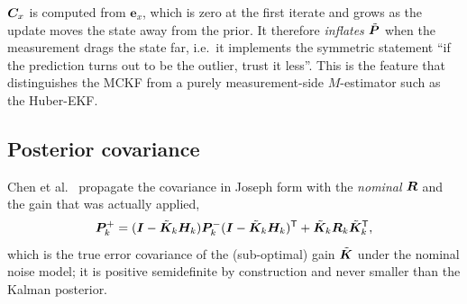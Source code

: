 \begin{remark}\label{rem:mc-Cx}
$\bm{C}_x$ is computed from $\bm{e}_x$, which is zero at the first iterate and grows as the update
moves the state away from the prior.  It therefore \emph{inflates} $\tilde{\bm{P}}$ when the
measurement drags the state far, i.e.\ it implements the symmetric statement ``if the prediction
turns out to be the outlier, trust it less''.  This is the feature that distinguishes the MCKF from
a purely measurement-side $M$-estimator such as the Huber-EKF.
\end{remark}

\subsection{Posterior covariance}
Chen et al.\ \cite[Eq.~(28)]{chen2017mckf} propagate the covariance in Joseph form with the
\emph{nominal} $\bm{R}$ and the gain that was actually applied,
\begin{equation}
\bm{P}^{+}_k=(\bm{I}-\tilde{\bm{K}}_k\bm{H}_k)\bm{P}^{-}_k(\bm{I}-\tilde{\bm{K}}_k\bm{H}_k)^{\mathsf{T}}
        +\tilde{\bm{K}}_k\bm{R}_k\tilde{\bm{K}}_k^{\mathsf{T}},
\label{eq:mc-P}
\end{equation}
which is the true error covariance of the (sub-optimal) gain $\tilde{\bm{K}}$ under the nominal noise
model; it is positive semidefinite by construction and never smaller than the Kalman posterior.

